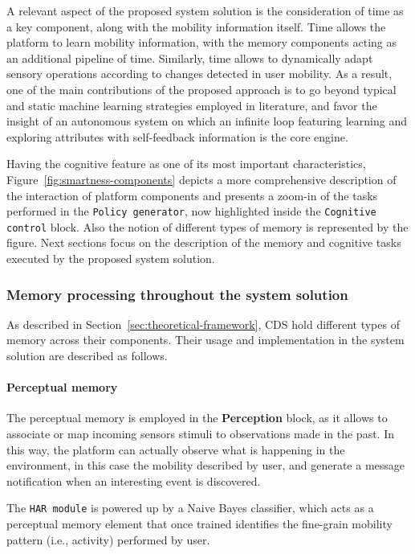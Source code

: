 \documentclass[ENG,PhD]{cinvestav}
\begin{document}
A relevant aspect of the proposed system solution is the consideration of time as a key component, along with the mobility information itself.
Time allows the platform to learn mobility information, with the memory components acting as an additional pipeline of time.
Similarly, time allows to dynamically adapt sensory operations according to changes detected in user mobility.
As a result, one of the main contributions of the proposed approach is to go beyond typical and static machine learning strategies employed in literature, and favor the insight of an autonomous system on which an infinite loop featuring learning and exploring attributes with self-feedback information is the core engine.

Having the cognitive feature as one of its most important characteristics, Figure~\ref{fig:smartness-components} depicts a more comprehensive description of the interaction of platform components and presents a zoom-in of the tasks performed in the \texttt{Policy generator}, now highlighted inside the \texttt{Cognitive control} block.
Also the notion of different types of memory is represented by the figure.
Next sections focus on the description of the memory and cognitive tasks executed by the proposed system solution.


\subsubsection{Memory processing throughout the system solution}
As described in Section~\ref{sec:theoretical-framework}, CDS hold different types of memory across their components.
Their usage and implementation in the system solution are described as follows.

\paragraph*{Perceptual memory} 
The perceptual memory is employed in the \textbf{Perception} block, as it allows to associate or map incoming sensors stimuli to observations made in the past.
In this way, the platform can actually observe what is happening in the environment, in this case the mobility described by user, and generate a message notification when an interesting event is discovered.

The \texttt{HAR module} is powered up by a Naive Bayes classifier, which acts as a perceptual memory element that once trained identifies the fine-grain mobility pattern (i.e., activity) performed by user.
\end{document}
